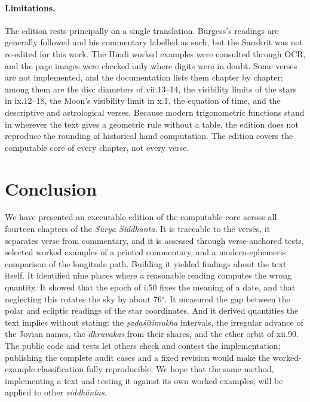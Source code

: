 \documentclass[11pt,a4paper]{article}
\newcommand{\SuSi}{\textit{S\=urya Siddh\=anta}}
\begin{document}
\paragraph{Limitations.} The edition rests principally on a single translation. Burgess's readings are generally followed and his commentary labelled as such, but the Sanskrit was not re-edited for this work. The Hindi worked examples were consulted through OCR, and the page images were checked only where digits were in doubt. Some verses are not implemented, and the documentation lists them chapter by chapter; among them are the disc diameters of vii.13--14, the visibility limits of the stars in ix.12--18, the Moon's visibility limit in x.1, the equation of time, and the descriptive and astrological verses. Because modern trigonometric functions stand in wherever the text gives a geometric rule without a table, the edition does not reproduce the rounding of historical hand computation. The edition covers the computable core of every chapter, not every verse.

\section{Conclusion}
\label{sec:conclusion}

We have presented an executable edition of the computable core across all fourteen chapters of the \SuSi{}. It is traceable to the verses, it separates verse from commentary, and it is assessed through verse-anchored tests, selected worked examples of a printed commentary, and a modern-ephemeris comparison of the longitude path. Building it yielded findings about the text itself. It identified nine places where a reasonable reading computes the wrong quantity. It showed that the epoch of i.50 fixes the meaning of a date, and that neglecting this rotates the sky by about 76$^\circ$. It measured the gap between the polar and ecliptic readings of the star coordinates. And it derived quantities the text implies without stating: the \textit{\d{s}a\d{d}a\'s\=itimukha} intervals, the irregular advance of the Jovian names, the \textit{dhruvakas} from their shares, and the ether orbit of xii.90. The public code and tests let others check and contest the implementation; publishing the complete audit cases and a fixed revision would make the worked-example classification fully reproducible. We hope that the same method, implementing a text and testing it against its own worked examples, will be applied to other \textit{siddh\=antas}.
\end{document}
